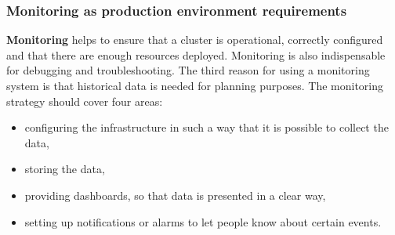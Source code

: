 \subsubsection{Monitoring as production environment requirements}
\textbf{Monitoring} helps to ensure that a cluster is operational, correctly configured and that there are enough resources deployed. Monitoring is also indispensable for debugging and troubleshooting\cite{book-mastering-k8s}. The third reason for using a monitoring system is that historical data is needed for planning purposes. The monitoring strategy should cover four areas\cite{book-cicd}:
\begin{itemize}
\item configuring the infrastructure in such a way that it is possible to collect the data,
\item storing the data,
\item providing dashboards, so that data is presented in a clear way,
\item setting up notifications or alarms to let people know about certain events.
\end{itemize}
